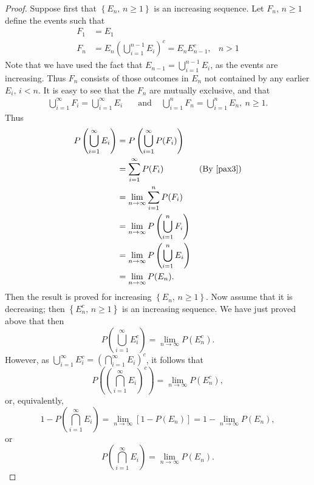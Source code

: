 \begin{proof}
    Suppose first that $\left\{ E_n, \, n \geq 1 \right\}$ is an increasing sequence. Let $F_n$, $n \geq 1$ define the events such that \[
        \begin{aligned}
            F_1 &= E_1 \\
            F_n &= E_n\left( \bigcup^{n-1}_{i = 1} E_i \right)^c = E_nE_{n-1}^c, & n > 1
        \end{aligned}
    \] Note that we have used the fact that $E_{n-1} = \bigcup^{n-1}_{i = 1} E_i$, as the events are increasing. Thus $F_n$ consists of those outcomes in $E_n$ not contained by any earlier $E_i, \, i < n$. It is easy to see that the $F_n$ are mutually exclusive, and that \[
        \begin{aligned}
            \bigcup^\infty_{i = 1} F_i = \bigcup^\infty_{i = 1} E_i &\:\:\:\text{ and }& \bigcup^n_{i = 1} F_n = \bigcup^n_{i = 1} E_n, \: n \geq 1.
        \end{aligned}
    \] Thus \[
        \begin{aligned}
            P\left( \bigcup^\infty_{i = 1} E_i \right) &= P\left( \bigcup^\infty_{i = 1} P(F_i) \right) \\
            &= \sum^\infty_{i = 1} P(F_i) & \text{(By \autoref{pax3})} \\
            &= \lim_{n \to \infty} \sum^n_{i = 1} P(F_i) \\
            &= \lim_{n \to \infty} P\left( \bigcup^n_{i = 1} F_i \right) \\
            &= \lim_{n \to \infty} P\left( \bigcup^n_{i = 1} E_i \right) \\
            &= \lim_{n \to \infty} P(E_n).
        \end{aligned}    
    \] Then the result is proved for increasing $\left\{ E_n, \, n \geq 1 \right\}$. Now assume that it is decreasing; then $\left\{ E_n^c, \, n \geq 1 \right\}$ is an increasing sequence. We have just proved above that then \[
        P\left( \bigcup^\infty_{i = 1} E_i^c \right) = \lim_{n \to \infty} P(E_n^c).    
    \] However, as $\bigcup^\infty_{i = 1} E_i^c = \left( \bigcap^\infty_{i = 1} E_i \right)^c$, it follows that \[
        P\left( \left( \bigcap^\infty_{i = 1} E_i \right)^c \right) = \lim_{n \to \infty} P(E_n^c),    
    \] or, equivalently, \[
        1 - P\left( \bigcap^\infty_{i = 1} E_i \right) = \lim_{n \to \infty} \left[ 1 - P(E_n) \right] = 1 - \lim_{n \to \infty} P(E_n),    
    \]  or \[
        P\left( \bigcap^\infty_{i = 1} E_i \right) = \lim_{n \to \infty} P(E_n).    
    \]
\end{proof}